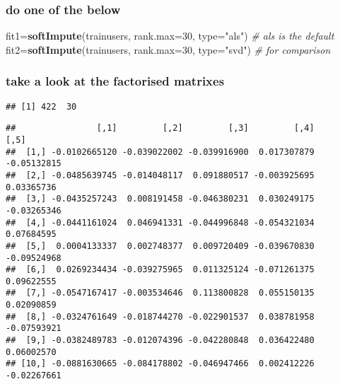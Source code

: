 \documentclass[]{article}
\newenvironment{Shaded}{\begin{snugshade}}{\end{snugshade}}
\newcommand{\CommentTok}[1]{\textcolor[rgb]{0.56,0.35,0.01}{\textit{#1}}}
\newcommand{\DataTypeTok}[1]{\textcolor[rgb]{0.13,0.29,0.53}{#1}}
\newcommand{\DecValTok}[1]{\textcolor[rgb]{0.00,0.00,0.81}{#1}}
\newcommand{\KeywordTok}[1]{\textcolor[rgb]{0.13,0.29,0.53}{\textbf{#1}}}
\newcommand{\NormalTok}[1]{#1}
\newcommand{\OperatorTok}[1]{\textcolor[rgb]{0.81,0.36,0.00}{\textbf{#1}}}
\newcommand{\StringTok}[1]{\textcolor[rgb]{0.31,0.60,0.02}{#1}}
\begin{document}
\hypertarget{do-one-of-the-below}{%
\subsubsection{do one of the below}\label{do-one-of-the-below}}

\begin{Shaded}
\begin{Highlighting}[]
\NormalTok{fit1=}\KeywordTok{softImpute}\NormalTok{(trainusers, }\DataTypeTok{rank.max=}\DecValTok{30}\NormalTok{, }\DataTypeTok{type=}\StringTok{"als"}\NormalTok{) }\CommentTok{# als is the default}
\NormalTok{fit2=}\KeywordTok{softImpute}\NormalTok{(trainusers, }\DataTypeTok{rank.max=}\DecValTok{30}\NormalTok{, }\DataTypeTok{type=}\StringTok{"svd"}\NormalTok{) }\CommentTok{# for comparison}
\end{Highlighting}
\end{Shaded}

\hypertarget{take-a-look-at-the-factorised-matrixes}{%
\subsubsection{take a look at the factorised
matrixes}\label{take-a-look-at-the-factorised-matrixes}}

\begin{Shaded}
\end{Shaded}

\begin{verbatim}
## [1] 422  30
\end{verbatim}

\begin{verbatim}
##                [,1]         [,2]         [,3]         [,4]        [,5]
##  [1,] -0.0102665120 -0.039022002 -0.039916900  0.017307879 -0.05132815
##  [2,] -0.0485639745 -0.014048117  0.091880517 -0.003925695  0.03365736
##  [3,] -0.0435257243  0.008191458 -0.046380231  0.030249175 -0.03265346
##  [4,] -0.0441161024  0.046941331 -0.044996848 -0.054321034  0.07684595
##  [5,]  0.0004133337  0.002748377  0.009720409 -0.039670830 -0.09524968
##  [6,]  0.0269234434 -0.039275965  0.011325124 -0.071261375  0.09622555
##  [7,] -0.0547167417 -0.003534646  0.113800828  0.055150135  0.02090859
##  [8,] -0.0324761649 -0.018744270 -0.022901537  0.038781958 -0.07593921
##  [9,] -0.0382489783 -0.012074396 -0.042280848  0.036422480  0.06002570
## [10,] -0.0881630665 -0.084178802 -0.046947466  0.002412226 -0.02267661
\end{verbatim}
\end{document}
